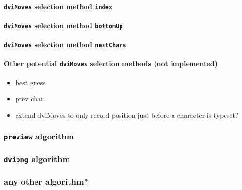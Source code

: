 \documentclass[]{article}
\let\oldparagraph\paragraph
\renewcommand{\paragraph}[1]{\oldparagraph{#1}\mbox{}}
\begin{document}
\paragraph{\texorpdfstring{\texttt{dviMoves} selection method
\texttt{index}}{dviMoves selection method index}}\label{dvimoves-selection-method-index}

\paragraph{\texorpdfstring{\texttt{dviMoves} selection method
\texttt{bottomUp}}{dviMoves selection method bottomUp}}\label{dvimoves-selection-method-bottomup}

\paragraph{\texorpdfstring{\texttt{dviMoves} selection method
\texttt{nextChars}}{dviMoves selection method nextChars}}\label{dvimoves-selection-method-nextchars}

\paragraph{\texorpdfstring{Other potential \texttt{dviMoves} selection
methods (not
implemented)}{Other potential dviMoves selection methods (not implemented)}}\label{other-potential-dvimoves-selection-methods-not-implemented}

\begin{itemize}
\item
  best guess
\item
  prev char
\item
  extend dviMoves to only record position just before a character is
  typeset?
\end{itemize}

\subsubsection{\texorpdfstring{\texttt{preview}
algorithm}{preview algorithm}}\label{preview-algorithm}

\subsubsection{\texorpdfstring{\texttt{dvipng}
algorithm}{dvipng algorithm}}\label{dvipng-algorithm}

\subsubsection{any other algorithm?}\label{any-other-algorithm}
\end{document}

